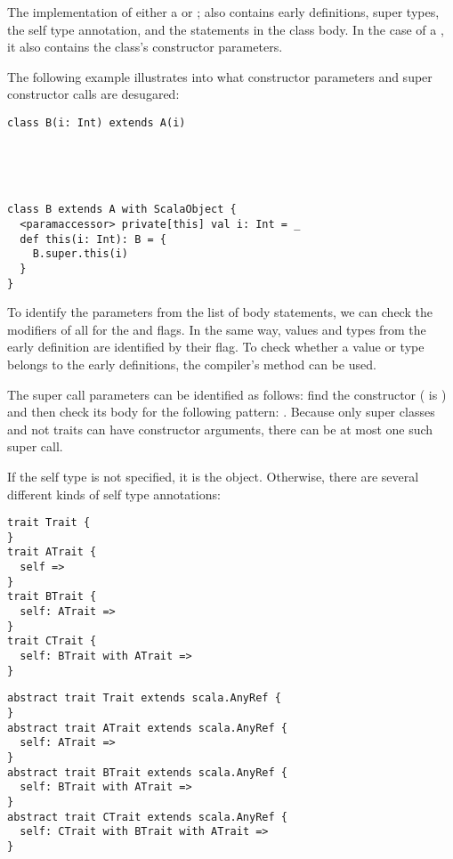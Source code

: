 \noindent The implementation of either a  or ; also contains early definitions, super types, the self type annotation, and the statements in the class body. In the case of a , it also contains the class's constructor parameters.

The following example illustrates into what constructor parameters and super constructor calls are desugared:

\begin{multicols}{2}
\begin{lstlisting}
class B(i: Int) extends A(i)





\end{lstlisting}

\begin{lstlisting}
class B extends A with ScalaObject {
  <paramaccessor> private[this] val i: Int = _
  def this(i: Int): B = {
    B.super.this(i)
  }
}
\end{lstlisting}
\end{multicols}

To identify the parameters from the list of body statements, we can check the modifiers of all  for the  and  flags. In the same way, values and types from the early definition are identified by their  flag. To check whether a value or type belongs to the early definitions, the compiler's  method can be used.

The super call parameters can be identified as follows: find the constructor  ( is ) and then check its body  for the following pattern: . Because only super classes and not traits can have constructor arguments, there can be at most one such super call.

If the self type is not specified, it is the  object. Otherwise, there are several different kinds of self type annotations:

\begin{multicols}{2}
\begin{lstlisting}
trait Trait {
}
trait ATrait {
  self =>
}
trait BTrait {
  self: ATrait =>
}
trait CTrait {
  self: BTrait with ATrait =>
}
\end{lstlisting}
\begin{lstlisting}
abstract trait Trait extends scala.AnyRef {
}
abstract trait ATrait extends scala.AnyRef { 
  self: ATrait => 
}
abstract trait BTrait extends scala.AnyRef {
  self: BTrait with ATrait =>
}
abstract trait CTrait extends scala.AnyRef {
  self: CTrait with BTrait with ATrait =>
}
\end{lstlisting}
\end{multicols}

